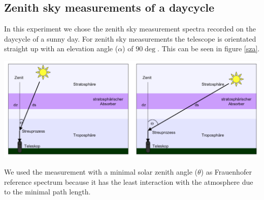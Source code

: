 \documentclass[12pt, english]{scrartcl} %
\newenvironment{Figure}
  {\par\medskip\noindent\minipage{\linewidth}}
  {\endminipage\par\medskip}
\begin{document}
\begin{multicols}{2}
\subsection{Zenith sky measurements of a daycycle}
In this experiment we chose the zenith sky measurement spectra recorded on the daycycle of a sunny day. For zenith sky measurements the telescope is orientated straight up with an elevation angle ($\alpha$) of $90 \deg$. This can be seen in figure \ref{sza}.\\
\begin{Figure}
 \centering
 \captionsetup{format=plain}
 \includegraphics[width=\linewidth]{graphics/sza.png}
 \label{sza}
\end{Figure}
We used the measurement with a minimal solar zenith angle ($\theta$) as Frauenhofer reference spectrum because it has the least interaction with the atmosphere due to the minimal path length. 

\end{multicols}
\end{document}
